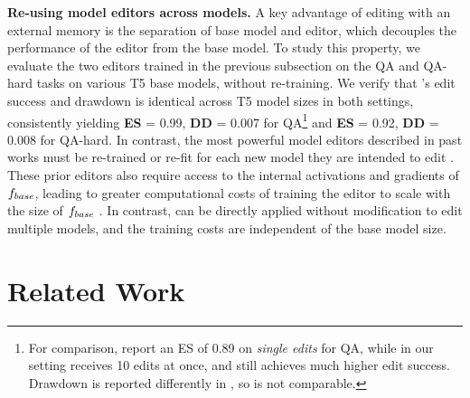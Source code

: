 \documentclass{article}
\begin{document}
\textbf{Re-using model editors across models.}
A key advantage of editing with an external memory is the separation of base model and editor, which decouples the performance of the editor from the base model. To study this property, we evaluate the two {\name} editors trained in the previous subsection on the QA and QA-hard tasks on various T5 base models, without re-training. We verify that {\name}'s edit success and drawdown is identical across T5 model sizes in both settings, consistently yielding \textbf{ES} = 0.99, \textbf{DD} = 0.007 for QA\footnote{For comparison, \citet{mitchell2021fast} report an ES of 0.89 on \textit{single edits} for QA, while in our setting {\name} receives 10 edits at once, and still achieves much higher edit success. Drawdown is reported differently in \citet{mitchell2021fast}, so is not comparable.} and \textbf{ES} = 0.92, \textbf{DD} = 0.008 for QA-hard. %
In contrast, the most powerful model editors described in past works must be re-trained or re-fit for each new model they are intended to edit \citep{Sinitsin2020Editable,Cao2021EditingFK,mitchell2021fast,anon2021moving}. These prior editors also require access to the internal activations and gradients of $f_{base}$, leading to greater computational costs of training the editor to scale with the size of $f_{base}$ \citep{mitchell2021fast}. In contrast, {\name} can be directly applied without modification to edit multiple models, and the training costs are independent of the base model size.

\section{Related Work}
\end{document}
